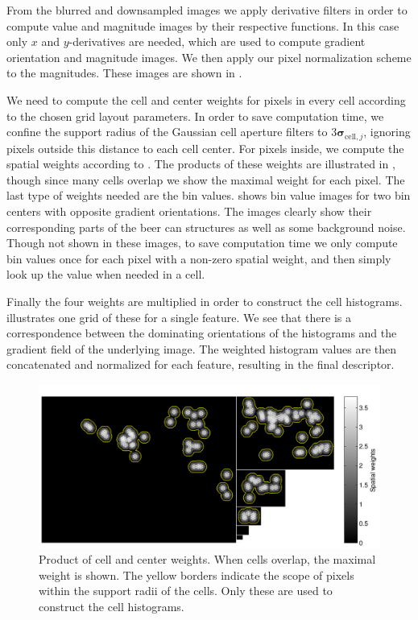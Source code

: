 \documentclass[thesis.tex]{subfiles}
\def\sigmacellj{\boldsymbol{\sigma}_{\text{cell},j}}
\begin{document}
From the blurred and downsampled images we apply derivative filters in order to compute value and magnitude images by their respective functions. In this case only $x$ and $y$-derivatives are needed, which are used to compute gradient orientation and magnitude images. We then apply our pixel normalization scheme to the magnitudes. These images are shown in .

We need to compute the cell and center weights for pixels in every cell according to the chosen grid layout parameters. In order to save computation time, we confine the support radius of the Gaussian cell aperture filters to $3 \sigmacellj$, ignoring pixels outside this distance to each cell center. For pixels inside, we compute the spatial weights according to . The products of these weights are illustrated in , though since many cells overlap we show the maximal weight for each pixel.
The last type of weights needed are the bin values.  shows bin value images for two bin centers with opposite gradient orientations. The images clearly show their corresponding parts of the beer can structures as well as some background noise. Though not shown in these images, to save computation time we only compute bin values once for each pixel with a non-zero spatial weight, and then simply look up the value when needed in a cell.


Finally the four weights are multiplied in order to construct the cell histograms.  illustrates one grid of these for a single feature. We see that there is a correspondence between the dominating orientations of the histograms and the gradient field of the underlying image. The weighted histogram values are then concatenated and normalized for each feature, resulting in the final descriptor.

\begin{figure}[tb]
    \centering
    \includegraphics[width=\textwidth]{img/cellHistScaleSpacesSpatialWeights.pdf}
    \caption{Product of cell and center weights. When cells overlap, the maximal weight is shown. The yellow borders indicate the scope of pixels within the support radii of the cells. Only these are used to construct the cell histograms.}
    \label{fig:cellHistScaleSpacesSpatialWeights}
\end{figure}
\end{document}
